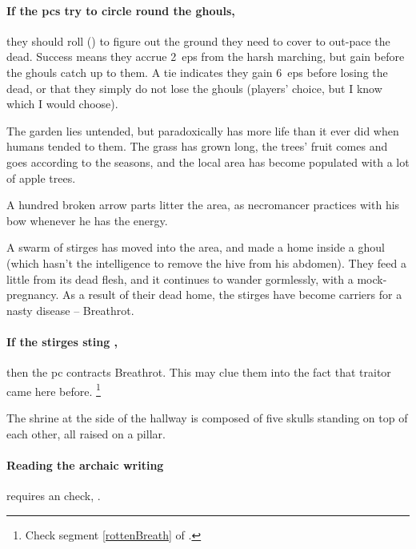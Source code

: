 \begin{multicols}{2}
\paragraph{If the \glspl{pc} try to circle round the ghouls,}
they should roll  (\tn[8]) to figure out the ground they need to cover to out-pace the dead.
Success means they accrue 2~\glspl{ep} from the harsh marching, but gain  before the ghouls catch up to them.
A tie indicates they gain 6~\glspl{ep} before losing the dead, or that they simply do not lose the ghouls (players' choice, but I know which I would choose).


The garden lies untended, but paradoxically has more life than it ever did when humans tended to them.
The grass has grown long, the trees' fruit comes and goes according to the seasons, and the local area has become populated with a lot of apple trees.

A hundred broken arrow parts litter the area, as \gls{necromancer} practices with his bow whenever he has the energy.

A swarm of stirges%
has moved into the area, and made a home inside a ghoul (which hasn't the intelligence to remove the hive from his abdomen).
They feed a little from its dead flesh, and it continues to wander gormlessly, with a mock-pregnancy.
As a result of their dead home, the stirges have become carriers for a nasty disease -- Breathrot.%


\paragraph{If the stirges sting ,}
then the \gls{pc} contracts Breathrot.
This may clue them into the fact that \gls{traitor} came here before.%
\footnote{\label{broTheftRef}Check \gls{segment} \vref{rottenBreath} of .}

\stirgeGhouls


The shrine at the side of the hallway is composed of five skulls standing on top of each other, all raised on a pillar.

\paragraph{Reading the archaic writing}
requires an  check, \tn[10].


\end{multicols}
